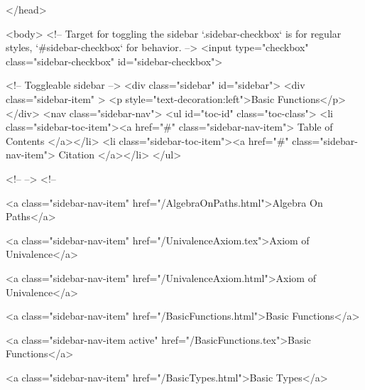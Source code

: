   
</head>




  <body>
    <!-- Target for toggling the sidebar `.sidebar-checkbox` is for regular
     styles, `#sidebar-checkbox` for behavior. -->
<input type="checkbox" class="sidebar-checkbox" id="sidebar-checkbox">

<!-- Toggleable sidebar -->
<div class="sidebar" id="sidebar">
  <div class="sidebar-item" >
    <p style="text-decoration:left">Basic Functions</p>
  </div>
  <nav class="sidebar-nav">
    <ul id="toc-id" class="toc-class">
  <li class="sidebar-toc-item"><a href="#" class="sidebar-nav-item"> Table of Contents </a></li>
  <li class="sidebar-toc-item"><a href="#" class="sidebar-nav-item"> Citation </a></li>
</ul>


    <!--  -->
    <!-- 
      
    
      
    
      
    
      
        
      
    
      
        
          <a class="sidebar-nav-item" href="/AlgebraOnPaths.html">Algebra On Paths</a>
        
      
    
      
        
          <a class="sidebar-nav-item" href="/UnivalenceAxiom.tex">Axiom of Univalence</a>
        
      
    
      
        
          <a class="sidebar-nav-item" href="/UnivalenceAxiom.html">Axiom of Univalence</a>
        
      
    
      
        
          <a class="sidebar-nav-item" href="/BasicFunctions.html">Basic Functions</a>
        
      
    
      
        
          <a class="sidebar-nav-item active" href="/BasicFunctions.tex">Basic Functions</a>
        
      
    
      
        
          <a class="sidebar-nav-item" href="/BasicTypes.html">Basic Types</a>
        
      
    
      
        

